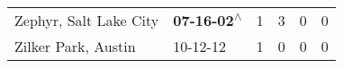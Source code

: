 \begin{supertabular}{p{0.4\textwidth}p{0.3\textwidth}p{0.05\textwidth}p{0.05\textwidth}p{0.05\textwidth}p{0.05\textwidth}}
                                                       Zephyr, Salt Lake City &                                                 \textbf{07-16-02\textsuperscript{$\wedge$}} &  1 &  3 &  0 &  0 \\
                                                          Zilker Park, Austin &                                                                  10-12-12\textsuperscript{} &  1 &  0 &  0 &  0 \\
\end{supertabular}
